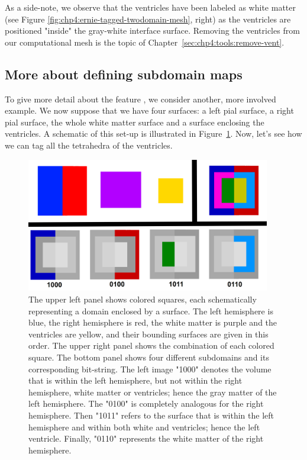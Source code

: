 
As a side-note, we observe that the ventricles have been labeled as
white matter (see Figure \ref{fig:chp4:ernie-tagged-twodomain-mesh},
right) as the ventricles are positioned "inside" the gray-white
interface surface. Removing the ventricles from our computational mesh
is the topic of Chapter~\ref{sec:chp4:tools:remove-vent}.

\subsection{More about defining \svmtk{} subdomain maps}  
\label{chp4:subdomains}

To give more detail about the \svmtk{} feature
, we consider another, more involved
example. We now suppose that we have four surfaces: a left pial
surface, a right pial surface, the whole white matter surface and a
surface enclosing the ventricles. A schematic of this set-up is
illustrated in Figure~\ref{fig:chp4:smap-example}. Now, let's see how
we can tag all the tetrahedra of the ventricles.
\begin{figure}[t]
  \includegraphics[width=0.95\textwidth]{./chapters/chp4/FIG/dot.png}
  \caption{The upper left panel shows colored squares, each
    schematically representing a domain enclosed by a surface. The
    left hemisphere is blue, the right hemisphere is red, the white
    matter is purple and the ventricles are yellow, and their bounding
    surfaces are given in this order. The upper right panel shows the
    combination of each colored square. The bottom panel shows four
    different subdomains and its corresponding bit-string. The left
    image "1000" denotes the volume that is within the left
    hemisphere, but not within the right hemisphere, white matter or
    ventricles; hence the gray matter of the left hemisphere. The
    "0100" is completely analogous for the right hemisphere. Then
    "1011" refers to the surface that is within the left hemisphere
    and within both white and ventricles; hence the left
    ventricle. Finally, "0110" represents the white matter of the
    right hemisphere.  }
\label{fig:chp4:smap-example}
\end{figure}

